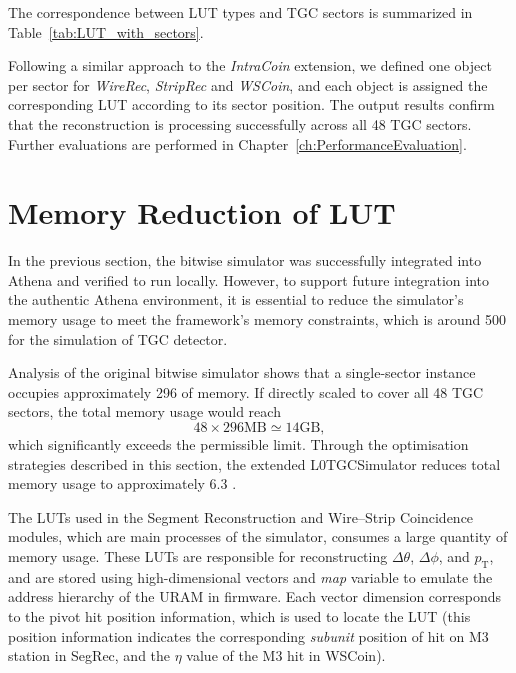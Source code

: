 The correspondence between LUT types and TGC sectors is summarized in Table~\ref{tab:LUT_with_sectors}.


Following a similar approach to the \textit{IntraCoin} extension, we defined one object per sector for \textit{WireRec}, \textit{StripRec} and \textit{WSCoin}, and each object is assigned the corresponding LUT according to its sector position. The output results confirm that the reconstruction is processing successfully across all 48 TGC sectors. Further evaluations are performed in Chapter~\ref{ch:PerformanceEvaluation}.
\section{Memory Reduction of LUT} \label{MemoryReduction}
In the previous section, the bitwise simulator was successfully integrated into Athena and verified to run locally. However, to support future integration into the authentic Athena environment, it is essential to reduce the simulator's memory usage to meet the framework’s memory constraints, which is around 500  for the simulation of TGC detector.

Analysis of the original bitwise simulator shows that a single-sector instance occupies approximately 296  of memory. If directly scaled to cover all 48 TGC sectors, the total memory usage would reach
\[
48 \times 296 \text{MB} \simeq 14 \text{GB},
\]
which significantly exceeds the permissible limit. Through the optimisation strategies described in this section, the extended L0TGCSimulator reduces total memory usage to approximately 6.3 .

The LUTs used in the Segment Reconstruction and Wire–Strip Coincidence modules, which are main processes of the simulator, consumes a large quantity of memory usage. These LUTs are responsible for reconstructing $\Delta\theta$, $\Delta\phi$, and $p_{\mathrm{T}}$, and are stored using high-dimensional vectors and \textit{map} variable to emulate the address hierarchy of the URAM in firmware. Each vector dimension corresponds to the pivot hit position information, which is used to locate the LUT (this position information indicates the corresponding \textit{subunit} position of hit on M3 station in SegRec, and the $\eta$ value of the M3 hit in WSCoin). 

